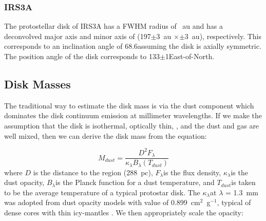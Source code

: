 \documentclass[twocolumn, 12pt, trackchanges]{aastex63}
\begin{document}
\subsubsection{IRS3A}
The protostellar disk of IRS3A has a FWHM radius of ~au and has a deconvolved major axis and minor axis of \space(197$\pm$3~au $\times$$\pm$3~au), respectively. This corresponds to an inclination angle of 68.6\deg\space assuming the disk is axially symmetric. The position angle of the disk corresponds to 133$\pm$1\deg\space East-of-North. 

\subsection{Disk Masses}\label{sec:diskmass}
The traditional way to estimate the disk mass is via the dust component which dominates the disk continuum emission at millimeter wavelengths. If we make the assumption that the disk is isothermal, optically thin, , and the dust and gas are well mixed, then we can derive the disk mass from the equation:

\begin{equation}\label{eq:dustmass}
    M_{dust} = \frac{D^2 F_{\lambda}}{\kappa_{\lambda}B_{\lambda}(T_{dust})}
\end{equation}
where $D$ is the distance to the region (288~pc), $F_{\lambda}$\space is the flux density, $\kappa_{\lambda}$\space is the dust opacity, $B_{\lambda}$\space is the Planck function for a dust temperature, and $T_{dust}$\space is taken to be the average temperature of a typical protostar disk. The $\kappa_{\lambda}$\space at $\lambda$ = 1.3~mm was adopted from dust opacity models with value of 0.899~cm$^2$~g$^{-1}$, typical of dense cores with thin icy-mantles \citep{1994AA...291..943O}. We then appropriately scale the opacity:
\end{document}
